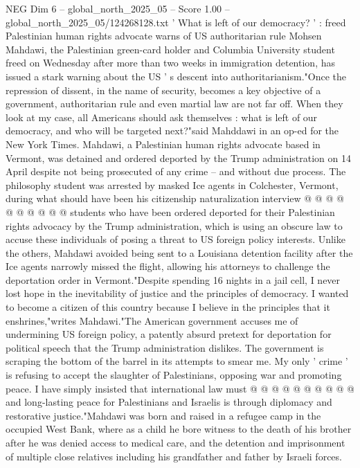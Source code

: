 \begin{textsample}{NEG Dim 6 – global\_north\_2025\_05 – Score 1.00 – global\_north\_2025\_05/124268128.txt}  \label{ex:f6_neg_382}
' What is left of our democracy? ' : freed Palestinian human rights advocate warns of US authoritarian rule Mohsen Mahdawi, the Palestinian green-card holder and Columbia University student freed on Wednesday after more than two weeks in immigration detention, has issued a stark warning about the US ' s descent into authoritarianism."Once the repression of dissent, in the name of security, becomes a key objective of a government, authoritarian rule and even martial law are not far off.
When they look at my case, all Americans should ask themselves : what is left of our democracy, and who will be targeted next?"said Mahddawi in an op-ed for the New York Times.
Mahdawi, a Palestinian human rights advocate based in Vermont, was detained and ordered deported by the Trump administration on 14 April despite not being prosecuted of any crime -- and without due process.
The philosophy student was arrested by masked Ice agents in Colchester, Vermont, during what should have been his citizenship naturalization interview @ @ @ @ @ @ @ @ @ @ students who have been ordered deported for their Palestinian rights advocacy by the Trump administration, which is using an obscure law to accuse these individuals of posing a threat to US foreign policy interests.
Unlike the others, Mahdawi avoided being sent to a Louisiana detention facility after the Ice agents narrowly missed the flight, allowing his attorneys to challenge the deportation order in Vermont."Despite spending 16 nights in a jail cell, I never lost hope in the inevitability of justice and the principles of democracy.
I wanted to become a citizen of this country because I believe in the principles that it enshrines,"writes Mahdawi."The American government accuses me of undermining US foreign policy, a patently absurd pretext for deportation for political speech that the Trump administration dislikes.
The government is scraping the bottom of the barrel in its attempts to smear me.
My only ' crime ' is refusing to accept the slaughter of Palestinians, opposing war and promoting peace.
I have simply insisted that international law must @ @ @ @ @ @ @ @ @ @ and long-lasting peace for Palestinians and Israelis is through diplomacy and restorative justice."Mahdawi was born and raised in a refugee camp in the occupied West Bank, where as a child he bore witness to the death of his brother after he was denied access to medical care, and the detention and imprisonment of multiple close relatives including his grandfather and father by Israeli forces.

\end{textsample}
